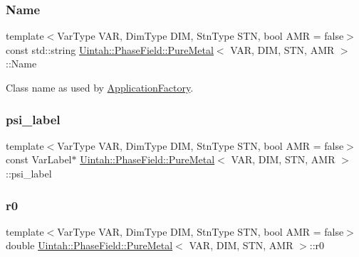 \subsubsection{\texorpdfstring{Name}{Name}}
{\footnotesize\ttfamily template$<$Var\+Type V\+AR, Dim\+Type D\+IM, Stn\+Type S\+TN, bool A\+MR = false$>$ \\
const std\+::string \hyperlink{classUintah_1_1PhaseField_1_1PureMetal}{Uintah\+::\+Phase\+Field\+::\+Pure\+Metal}$<$ V\+AR, D\+IM, S\+TN, A\+MR $>$\+::Name\hspace{0.3cm}{\ttfamily [static]}}



Class name as used by \hyperlink{classUintah_1_1PhaseField_1_1ApplicationFactory}{Application\+Factory}. 

\mbox{\label{classUintah_1_1PhaseField_1_1PureMetal_a58c7327ed5dc1be030db14e120e22101}} 
\subsubsection{\texorpdfstring{psi\+\_\+label}{psi\_label}}
{\footnotesize\ttfamily template$<$Var\+Type V\+AR, Dim\+Type D\+IM, Stn\+Type S\+TN, bool A\+MR = false$>$ \\
const Var\+Label$\ast$ \hyperlink{classUintah_1_1PhaseField_1_1PureMetal}{Uintah\+::\+Phase\+Field\+::\+Pure\+Metal}$<$ V\+AR, D\+IM, S\+TN, A\+MR $>$\+::psi\+\_\+label\hspace{0.3cm}{\ttfamily [protected]}}

\mbox{\label{classUintah_1_1PhaseField_1_1PureMetal_ad3ef1c4a83946912d066e2e100657b62}} 
\subsubsection{\texorpdfstring{r0}{r0}}
{\footnotesize\ttfamily template$<$Var\+Type V\+AR, Dim\+Type D\+IM, Stn\+Type S\+TN, bool A\+MR = false$>$ \\
double \hyperlink{classUintah_1_1PhaseField_1_1PureMetal}{Uintah\+::\+Phase\+Field\+::\+Pure\+Metal}$<$ V\+AR, D\+IM, S\+TN, A\+MR $>$\+::r0\hspace{0.3cm}{\ttfamily [protected]}}



